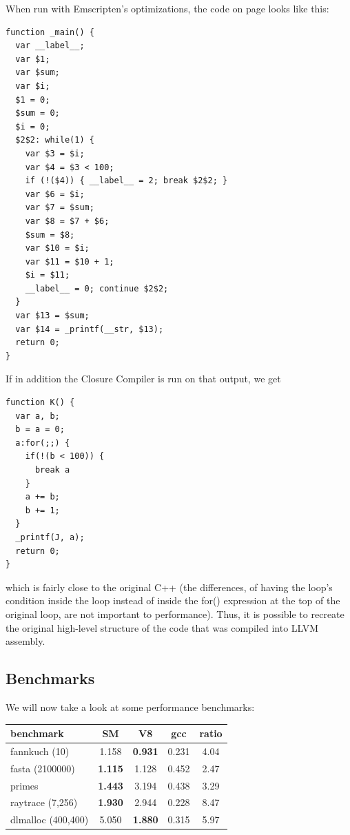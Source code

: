 \documentclass[preprint,10pt]{sigplanconf}
\begin{document}
When run with Emscripten's optimizations, the code on page \pageref{code:example} looks
like this:
\begin{verbatim}
function _main() {
  var __label__;
  var $1;
  var $sum;
  var $i;
  $1 = 0;
  $sum = 0;
  $i = 0;
  $2$2: while(1) {
    var $3 = $i;
    var $4 = $3 < 100;
    if (!($4)) { __label__ = 2; break $2$2; }
    var $6 = $i;
    var $7 = $sum;
    var $8 = $7 + $6;
    $sum = $8;
    var $10 = $i;
    var $11 = $10 + 1;
    $i = $11;
    __label__ = 0; continue $2$2;
  }
  var $13 = $sum;
  var $14 = _printf(__str, $13);
  return 0;
}
\end{verbatim}
If in addition the Closure Compiler is run on that output, we get
\begin{verbatim}
function K() {
  var a, b;
  b = a = 0;
  a:for(;;) {
    if(!(b < 100)) {
      break a
    }
    a += b;
    b += 1;
  }
  _printf(J, a);
  return 0;
}
\end{verbatim}
which is fairly close to the original C++ (the differences, of
having the loop's condition inside the loop instead of inside
the for() expression at the top of the original loop, are not important to performance). Thus, it is possible
to recreate the original high-level structure of the code that
was compiled into LLVM assembly.

\subsection{Benchmarks}
\label{sec:benchmarks}

We will now take a look at some performance benchmarks:

\bigskip

\begin{tabular}{ l | c | c | c || c }
  \hline
  \textbf{benchmark} & \textbf{SM}    & \textbf{V8}    & \textbf{gcc} & \textbf{ratio} \\
  \hline
  fannkuch (10)      & 1.158          & \textbf{0.931} & 0.231       &  4.04 \\
  fasta (2100000)    & \textbf{1.115} & 1.128          & 0.452       &  2.47 \\
  primes             & \textbf{1.443} & 3.194          & 0.438       &  3.29 \\
  raytrace (7,256)   & \textbf{1.930} & 2.944          & 0.228       &  8.47 \\
  dlmalloc (400,400) & 5.050          & \textbf{1.880} & 0.315       &  5.97 \\
  \hline
\end{tabular}
\end{document}
